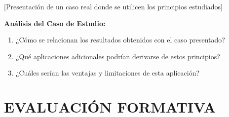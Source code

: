 \documentclass[12pt,a4paper]{article}
\begin{document}
	[Presentación de un caso real donde se utilicen los principios estudiados]
	
	\begin{preguntabox}
		\textbf{Análisis del Caso de Estudio:}
		\begin{enumerate}
			\item ¿Cómo se relacionan los resultados obtenidos con el caso presentado?
			
			\vspace{2cm}
			
			\item ¿Qué aplicaciones adicionales podrían derivarse de estos principios?
			
			\vspace{2cm}
			
			\item ¿Cuáles serían las ventajas y limitaciones de esta aplicación?
			
			\vspace{2cm}
		\end{enumerate}
	\end{preguntabox}
	
	
	\section{EVALUACIÓN FORMATIVA}
	
\end{document}
